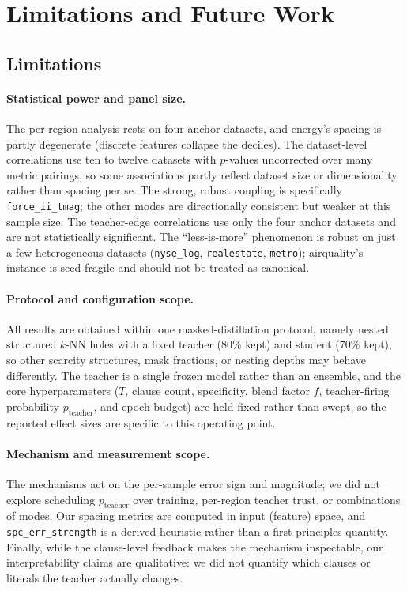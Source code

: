 \section{Limitations and Future Work}
\label{sec:limitations}

\subsection{Limitations}

\paragraph{Statistical power and panel size.}
The per-region analysis rests on four anchor datasets, and energy's spacing is partly
degenerate (discrete features collapse the deciles). The dataset-level correlations use
ten to twelve datasets with $p$-values uncorrected over many metric pairings, so some
associations partly reflect dataset size or dimensionality rather than spacing per se. The
strong, robust coupling is specifically \texttt{force\_ii\_tmag}; the other modes are
directionally consistent but weaker at this sample size. The teacher-edge correlations use
only the four anchor datasets and are not statistically significant. The ``less-is-more''
phenomenon is robust on just a few heterogeneous datasets (\texttt{nyse\_log},
\texttt{realestate}, \texttt{metro}); airquality's instance is seed-fragile and should not
be treated as canonical.

\paragraph{Protocol and configuration scope.}
All results are obtained within one masked-distillation protocol, namely nested structured
$k$-NN holes with a fixed teacher (80\% kept) and student (70\% kept), so other scarcity
structures, mask fractions, or nesting depths may behave differently. The teacher is a
single frozen model rather than an ensemble, and the core hyperparameters ($T$, clause
count, specificity, blend factor $f$, teacher-firing probability $p_{\text{teacher}}$, and
epoch budget) are held fixed rather than swept, so the reported effect sizes are specific
to this operating point.

\paragraph{Mechanism and measurement scope.}
The mechanisms act on the per-sample error sign and magnitude; we did not explore
scheduling $p_{\text{teacher}}$ over training, per-region teacher trust, or combinations of
modes. Our spacing metrics are computed in input (feature) space, and \texttt{spc\_err\_strength}
is a derived heuristic rather than a first-principles quantity. Finally, while the
clause-level feedback makes the mechanism inspectable, our interpretability claims are
qualitative: we did not quantify which clauses or literals the teacher actually changes.

